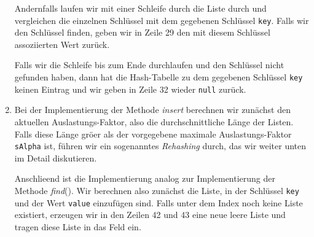 \begin{enumerate}
      Andernfalls laufen wir mit einer Schleife durch die Liste durch und vergleichen 
      die einzelnen Schl\"ussel mit dem gegebenen Schl\"ussel \texttt{key}.
      Falls wir den Schl\"ussel finden, geben wir in Zeile 29 den mit diesem Schl\"ussel
      assoziierten Wert zur\"uck.

      Falls wir die Schleife bis zum Ende durchlaufen und den Schl\"ussel nicht gefunden
      haben, dann hat die Hash-Tabelle zu dem gegebenen Schl\"ussel \texttt{key} keinen
      Eintrag und wir geben in Zeile 32 wieder \texttt{null} zur\"uck.

\item Bei der Implementierung der Methode \textsl{insert} berechnen wir zun\"achst den
      aktuellen Auslastungs-Faktor, also die durchschnittliche L\"ange der Listen.  Falls diese L\"ange
      gr\"o\3er als der vorgegebene maximale Auslastungs-Faktor \texttt{sAlpha} ist,
      f\"uhren wir ein sogenanntes \emph{Rehashing} durch, das wir weiter unten im Detail
      diskutieren.

      Anschlie\3end ist die Implementierung analog zur Implementierung der Methode
      \textsl{find}().  Wir berechnen also zun\"achst die Liste, in der Schl\"ussel
      \texttt{key} und der Wert \texttt{value} einzuf\"ugen sind.  Falls unter dem Index
      noch keine Liste existiert, erzeugen wir in den Zeilen 42 und 43 eine neue leere
      Liste und tragen diese Liste in das Feld ein.  


\end{enumerate}
